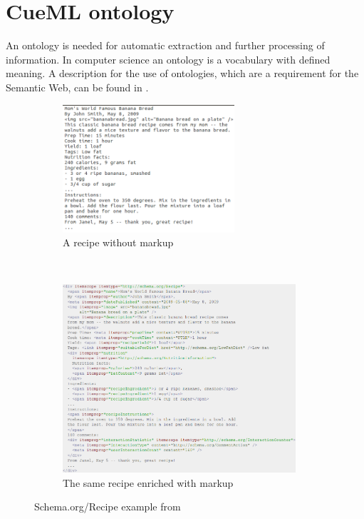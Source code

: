 \documentclass[12pt, twoside]{report}
\begin{document}
\section{CueML ontology}\label{sec:cueMLOntology}
An ontology is needed for automatic extraction and further processing of information. In computer science an ontology is a vocabulary with defined meaning. A description for the use of ontologies, which are a requirement for the Semantic Web, can be found in \parencite{semanticWeb}.

\begin{figure}
	\begin{subfigure}{1\textwidth}
		\centering
		\includegraphics[width=0.7\textwidth]{Images/schemaRecipeWithoutMarkup}
		\caption{A recipe without markup}
	\end{subfigure} \\
	\begin{subfigure}{1\textwidth}
		\centering
		\includegraphics[width=0.95\textwidth]{Images/schemaRecipeWithMarkup}
		\caption{The same recipe enriched with markup}
	\end{subfigure}
	\caption{Schema.org/Recipe example from \parencite{schemaRecipe}}
	\label{fig:schemaOrgRecipe}
\end{figure}
\end{document}

